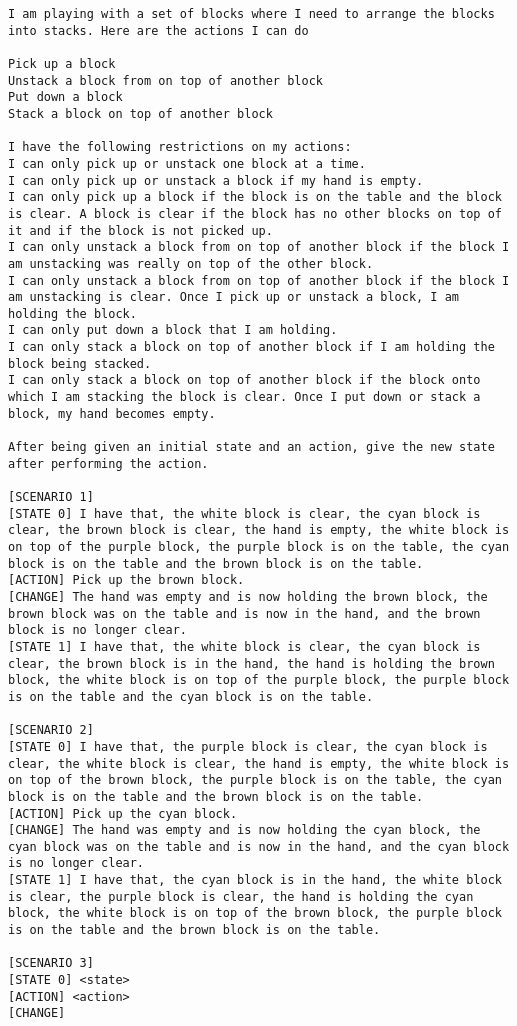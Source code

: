 \begin{lstlisting}[breaklines=true,breakatwhitespace=true]
I am playing with a set of blocks where I need to arrange the blocks into stacks. Here are the actions I can do 

Pick up a block 
Unstack a block from on top of another block 
Put down a block 
Stack a block on top of another block 

I have the following restrictions on my actions:
I can only pick up or unstack one block at a time. 
I can only pick up or unstack a block if my hand is empty. 
I can only pick up a block if the block is on the table and the block is clear. A block is clear if the block has no other blocks on top of it and if the block is not picked up. 
I can only unstack a block from on top of another block if the block I am unstacking was really on top of the other block. 
I can only unstack a block from on top of another block if the block I am unstacking is clear. Once I pick up or unstack a block, I am holding the block. 
I can only put down a block that I am holding. 
I can only stack a block on top of another block if I am holding the block being stacked. 
I can only stack a block on top of another block if the block onto which I am stacking the block is clear. Once I put down or stack a block, my hand becomes empty.

After being given an initial state and an action, give the new state after performing the action.

[SCENARIO 1]
[STATE 0] I have that, the white block is clear, the cyan block is clear, the brown block is clear, the hand is empty, the white block is on top of the purple block, the purple block is on the table, the cyan block is on the table and the brown block is on the table.
[ACTION] Pick up the brown block.
[CHANGE] The hand was empty and is now holding the brown block, the brown block was on the table and is now in the hand, and the brown block is no longer clear.
[STATE 1] I have that, the white block is clear, the cyan block is clear, the brown block is in the hand, the hand is holding the brown block, the white block is on top of the purple block, the purple block is on the table and the cyan block is on the table.

[SCENARIO 2]
[STATE 0] I have that, the purple block is clear, the cyan block is clear, the white block is clear, the hand is empty, the white block is on top of the brown block, the purple block is on the table, the cyan block is on the table and the brown block is on the table.
[ACTION] Pick up the cyan block.
[CHANGE] The hand was empty and is now holding the cyan block, the cyan block was on the table and is now in the hand, and the cyan block is no longer clear.
[STATE 1] I have that, the cyan block is in the hand, the white block is clear, the purple block is clear, the hand is holding the cyan block, the white block is on top of the brown block, the purple block is on the table and the brown block is on the table.

[SCENARIO 3]
[STATE 0] <state>
[ACTION] <action>
[CHANGE]
\end{lstlisting}

